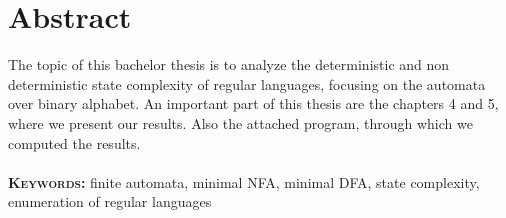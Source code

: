 \chapter{Abstract}
The topic of this bachelor thesis is to analyze the deterministic and non deterministic state complexity of regular languages, focusing on the automata over binary alphabet. An important part of this thesis are the chapters 4 and 5, where we present our results. Also the attached program, through which we computed the results. \\ \\
\textbf{\textsc{Keywords:}} finite automata, minimal NFA, minimal DFA, state complexity, enumeration of regular languages
